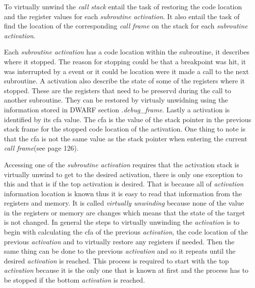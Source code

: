  


To virtually unwind the \emph{call stack} entail the task of restoring the code location and the register values for each \emph{subroutine activation}.
It also entail the task of find the location of the corresponding \emph{call frame} on the stack for each \emph{subroutine activation}.


Each \emph{subroutine activation} has a code location within the subroutine, it describes where it stopped.
The reason for stopping could be that a breakpoint was hit, it was interrupted by a event or it could be location were it made a call to the next subroutine.
A activation also describe the state of some of the registers where it stopped.
These are the registers that need to be preservd during the call to another subroutine.
They can be restored by virtualy unwidning using the information stored in \gls{DWARF} section \emph{.debug\_frame}.
Lastly a activation is identified by its \gls{cfa} value. 
The \gls{cfa} is the value of the stack pointer in the previous stack frame for the stopped code location of the activation.
One thing to note is that the \gls{cfa} is not the same value as the stack pointer when entering the current \emph{call frame}(see \cite{dwarf} page 126).


Accessing one of the \emph{subroutine activation} requires that the activation stack is virtually unwind to get to the desired activation, there is only one exception to this and that is if the top activation is desired.
That is because all of \emph{activation} information location is known thus it is easy to read that information from the registers and memory. 
It is called \emph{virtually unwinding} because none of the value in the registers or memory are changes which means that the state of the target is not changed.
In general the steps to virtually unwinding the \emph{activation} is to begin with calculating the \gls{cfa} of the previous \emph{activation}, the code location of the previous \emph{activation} and to virtually restore any registers if needed.
Then the same thing can be done to the previous \emph{activation} and so it repeats until the desired \emph{activation} is reached.
This process is required to start with the top \emph{activation} because it is the only one that is known at first and the process has to be stopped if the bottom \emph{activation} is reached.




